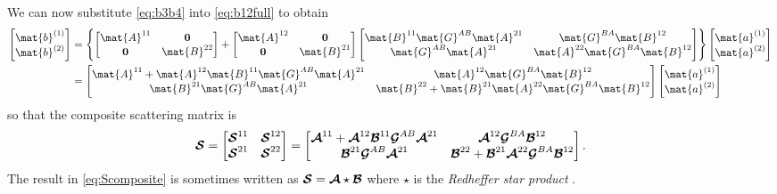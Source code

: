 We can now substitute \eqref{eq:b3b4} into \eqref{eq:b12full}
to obtain
\begin{align}
  \colvec{\mat{b}\one \\ \mat{b}\two}
  &=
  \left\{
    \begin{bmatrix}
      \mat{A}^{11} & \0 \\
      \0 & \mat{B}^{22}
    \end{bmatrix}
    +
    \begin{bmatrix}
      \mat{A}^{12} & \0 \\
      \0 & \mat{B}^{21}
    \end{bmatrix}
    \begin{bmatrix}
      \mat{B}^{11} \mat{G}^{AB} \mat{A}^{21} & \mat{G}^{BA} \mat{B}^{12} \\
      \mat{G}^{AB} \mat{A}^{21} & \mat{A}^{22} \mat{G}^{BA} \mat{B}^{12}
    \end{bmatrix}
  \right\}
  \colvec{\mat{a}\one \\ \mat{a}\two} \nonumber \\
  &=
  \begin{bmatrix}
    \mat{A}^{11} + \mat{A}^{12}\mat{B}^{11}\mat{G}^{AB}\mat{A}^{21} &
    \mat{A}^{12}\mat{G}^{BA}\mat{B}^{12} \\
    \mat{B}^{21}\mat{G}^{AB}\mat{A}^{21} & 
    \mat{B}^{22} + \mat{B}^{21}\mat{A}^{22} \mat{G}^{BA} \mat{B}^{12}
  \end{bmatrix}
  \colvec{\mat{a}\one \\ \mat{a}\two} \nonumber 
\end{align}
so that the composite scattering matrix is
\begin{equation}
  \label{eq:Scomposite}
  \boldsymbol{\mathcal{S}} = 
  \begin{bmatrix}
    \boldsymbol{\mathcal{S}}^{11} &   \boldsymbol{\mathcal{S}}^{12} \\
    \boldsymbol{\mathcal{S}}^{21} &   \boldsymbol{\mathcal{S}}^{22} 
  \end{bmatrix}
  =
  \begin{bmatrix}
    \boldsymbol{\mathcal{A}}^{11} + \boldsymbol{\mathcal{A}}^{12}\boldsymbol{\mathcal{B}}^{11}\boldsymbol{\mathcal{G}}^{AB}\boldsymbol{\mathcal{A}}^{21} &
    \boldsymbol{\mathcal{A}}^{12}\boldsymbol{\mathcal{G}}^{BA}\boldsymbol{\mathcal{B}}^{12} \\
    \boldsymbol{\mathcal{B}}^{21}\boldsymbol{\mathcal{G}}^{AB}\boldsymbol{\mathcal{A}}^{21} & 
    \boldsymbol{\mathcal{B}}^{22} + \boldsymbol{\mathcal{B}}^{21}\boldsymbol{\mathcal{A}}^{22} \boldsymbol{\mathcal{G}}^{BA} \boldsymbol{\mathcal{B}}^{12}
  \end{bmatrix}.
\end{equation}
The result in \eqref{eq:Scomposite} is sometimes written as $\boldsymbol{\mathcal{S}} = \boldsymbol{\mathcal{A}} \star \boldsymbol{\mathcal{B}}$ where
$\star$ is the \emph{Redheffer star product} \cite{redh:61}.

